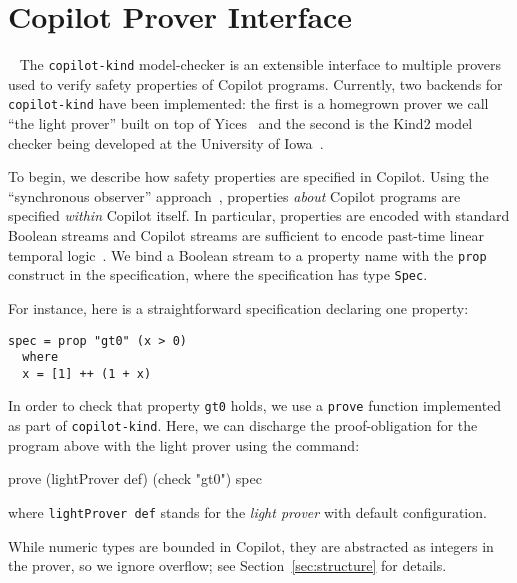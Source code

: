 \section{Copilot Prover Interface}~\label{sec:prover} 
The \texttt{copilot-kind} model-checker is an extensible interface to multiple
provers used to verify safety properties of Copilot
programs. Currently, two backends for \texttt{copilot-kind} have been implemented: the first is a
homegrown prover we call ``the light prover'' built on top of
Yices~\cite{Dutertre:cav2014} and the second is the Kind2 model checker being developed at
the University of Iowa~\cite{kind}.

To begin, we describe how safety properties are specified in Copilot. Using the
``synchronous observer'' approach~\cite{amast93}, properties \emph{about}
Copilot programs are specified \emph{within} Copilot itself. In particular,
properties are encoded with standard Boolean streams and Copilot streams are
sufficient to encode past-time linear temporal logic~\cite{ptltl}. We bind a Boolean stream
to a property name with the \texttt{prop} construct in the specification, where
the specification has type \texttt{Spec}. 

For instance, here is a straightforward specification declaring one
property:

\begin{lstlisting}[frame=single]
spec = prop "gt0" (x > 0)
  where 
  x = [1] ++ (1 + x)
\end{lstlisting}

\noindent
In order  to check that property \texttt{gt0} holds, we use a \texttt{prove}
function implemented as part of \texttt{copilot-kind}.
Here, we can discharge the proof-obligation for the program above with the light prover using the command:
\begin{code}
prove (lightProver def) (check "gt0") spec
\end{code}
where \texttt{lightProver def} stands for the \emph{light prover} with
default configuration.

While numeric types are bounded in Copilot, they are abstracted as integers in
the prover, so we ignore overflow; see Section~\ref{sec:structure} for details.

